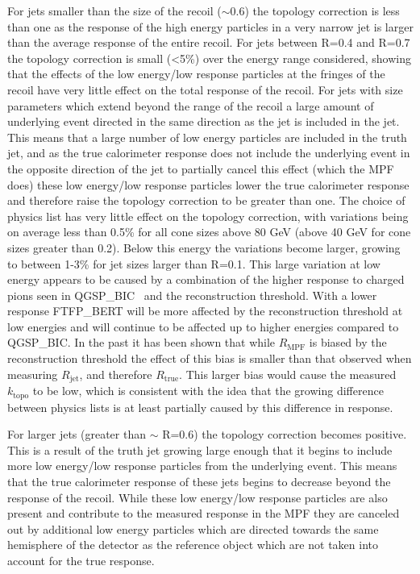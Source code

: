 For jets smaller than the size of the recoil ($\sim$0.6) the topology correction is less than one as the response of the high energy particles in a very narrow jet is larger than the average response of the entire recoil.  
For jets between R=0.4 and R=0.7 the topology correction is small (<5\%) over the energy range considered, showing that the effects of the low energy/low response particles at the fringes of the recoil have very little effect on the total response of the recoil.  
For jets with size parameters which extend beyond the range of the recoil a large amount of underlying event directed in the same direction as the jet is included in the jet.  
This means that a large number of low energy particles are included in the truth jet, and as the true calorimeter response does not include the underlying event in the opposite direction of the jet to partially cancel this effect (which the MPF does) these low energy/low response particles lower the true calorimeter response and therefore raise the topology correction to be greater than one.  
The choice of physics list has very little effect on the topology correction, with variations being on average less than 0.5\% for all cone sizes above 80 GeV (above 40 GeV for cone sizes greater than 0.2).   
Below this energy the variations become larger, growing to between 1-3\% for jet sizes larger than R=0.1.  
This large variation at low energy appears to be caused by a combination of the higher response to charged pions seen in QGSP\_BIC~\cite{Zhang:2253040} and the reconstruction threshold.  
With a lower response FTFP\_BERT will be more affected by the reconstruction threshold at low energies and will continue to be affected up to higher energies compared to QGSP\_BIC.
In the past it has been shown that while $R_{\mathrm{MPF}}$ is biased by the reconstruction threshold the effect of this bias is smaller than that observed when measuring $R_{\mathrm{jet}}$, and therefore $R_{\mathrm{true}}$.
This larger bias would cause the measured $k_{\mathrm{topo}}$ to be low, which is consistent with the idea that the growing difference between physics lists is at least partially caused by this difference in response.

For larger jets (greater than $\sim$ R=0.6) the topology correction becomes positive.  
This is a result of the truth jet growing large enough that it begins to include more low energy/low response particles from the underlying event.  
This means that the true calorimeter response of these jets begins to decrease beyond the response of the recoil.  
While these low energy/low response particles are also present and contribute to the measured response in the MPF they are canceled out by additional low energy particles which are directed towards the same hemisphere of the detector as the reference object which are not taken into account for the true response.  


